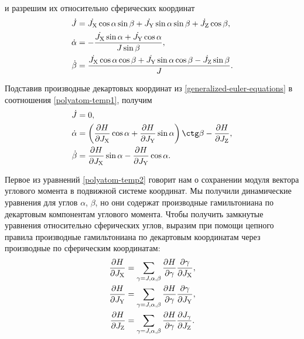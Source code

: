 и разрешим их относительно сферических координат
\begin{gather}
    \begin{aligned}
        \dot{J} &= \dot{J_\text{X}} \cos \alpha \sin \beta + \dot{J_\text{Y}} \sin \alpha \sin \beta + \dot{J_\text{Z}} \cos \beta, \\
        \dot{\alpha} &= -\frac{\dot{J_\text{X}} \sin \alpha + \dot{J_\text{Y}} \cos \alpha}{J \sin \beta}, \\
        \dot{\beta} &= \frac{\dot{J_\text{X}} \cos \alpha \cos \beta + \dot{J_\text{Y}} \sin \alpha \cos \beta  - \dot{J_\text{Z}} \sin \beta}{J}.
    \end{aligned} \label{polyatom-temp1}
\end{gather}

Подставив производные декартовых координат из \eqref{generalized-euler-equations} в соотношения \eqref{polyatom-temp1}, получим
\begin{gather}
    \begin{aligned}
        \dot{J} &= 0, \\
        \dot{\alpha} &= \lb \frac{\partial H}{\partial \Jx} \cos \alpha + \frac{\partial H}{\partial \Jy} \sin \alpha \rb \ctg \beta - \frac{\partial H}{\partial \Jz}, \\
        \dot{\beta} &= \frac{\partial H}{\partial \Jx} \sin \alpha - \frac{\partial H}{\partial \Jy} \cos \alpha.
    \end{aligned} \label{polyatom-temp2}
\end{gather}

Первое из уравнений \eqref{polyatom-temp2} говорит нам о сохранении модуля вектора углового момента в подвижной системе координат. Мы получили динамические уравнения для углов $\alpha$, $\beta$, но они содержат производные гамильтониана по декартовым компонентам углового момента. Чтобы получить замкнутые уравнения относительно сферических углов, выразим при помощи цепного правила производные гамильтониана по декартовым координатам через производные по сферическим координатам:    
\begin{gather}
    \begin{aligned}
        \frac{\partial H}{\partial J_\text{X}} &= \sum_{\gamma = J, \alpha, \beta} \frac{\partial H}{\partial \gamma} \frac{\partial \gamma}{\partial J_\text{X}}, \\
        \frac{\partial H}{\partial J_\text{Y}} &= \sum_{\gamma = J, \alpha, \beta} \frac{\partial H}{\partial \gamma} \frac{\partial \gamma}{\partial J_\text{Y}}, \\
        \frac{\partial H}{\partial J_\text{Z}} &= \sum_{\gamma = J, \alpha, \beta} \frac{\partial H}{\partial \gamma} \frac{\partial J_\gamma}{\partial J_\text{Z}}.
    \end{aligned} \label{polyatom-temp3}
\end{gather}

